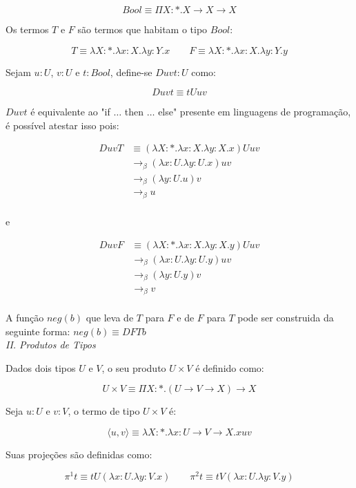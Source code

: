 \documentclass[../main.tex]{subfiles}
\begin{document}
$$Bool \equiv \Pi X : \ast . X \to X \to X$$

Os termos $T$ e $F$ são termos que habitam o tipo $Bool$:

$$T \equiv \lambda X : \ast . \lambda x : X . \lambda y : Y . x \qquad F \equiv \lambda X : \ast . \lambda x : X . \lambda y : Y . y$$

Sejam $u : U$, $v : U$ e $t : Bool$, define-se $Duvt : U$ como:

$$Duvt \equiv tUuv$$

$Duvt$ é equivalente ao "if $\dots$ then $\dots$ else" presente em linguagens de programação, é possível atestar isso pois:

\begin{align*}
    DuvT & \equiv (\lambda X : \ast . \lambda x : X . \lambda y : X . x)Uuv \\
         & \to_{\beta} (\lambda x : U . \lambda y : U . x)uv \\
         & \to_{\beta} (\lambda y : U . u)v \\
         & \to_{\beta} u \\
\end{align*}

e

\begin{align*}
    DuvF & \equiv (\lambda X : \ast . \lambda x : X . \lambda y : X . y)Uuv \\
         & \to_{\beta} (\lambda x : U . \lambda y : U . y)uv \\
         & \to_{\beta} (\lambda y : U . y)v \\
         & \to_{\beta} v \\
\end{align*}

A função $neg(b)$ que leva de $T$ para $F$ e de $F$ para $T$ pode ser construida da seguinte forma: $neg(b) \equiv DFTb$\\

\emph{II. Produtos de Tipos}

Dados dois tipos $U$ e $V$, o seu produto $U \times V$ é definido como:

$$U \times V \equiv \Pi X : \ast . (U \to V \to X) \to X$$

Seja $u : U$ e $v : V$, o termo de tipo $U \times V$ é:

$$\langle u, v \rangle \equiv \lambda X : \ast . \lambda x : U \to V \to X . xuv$$

Suas projeções são definidas como:

$$\pi^1 t \equiv tU(\lambda x : U . \lambda y : V . x) \qquad \pi^2 t \equiv tV(\lambda x : U . \lambda y : V . y)$$
\end{document}
